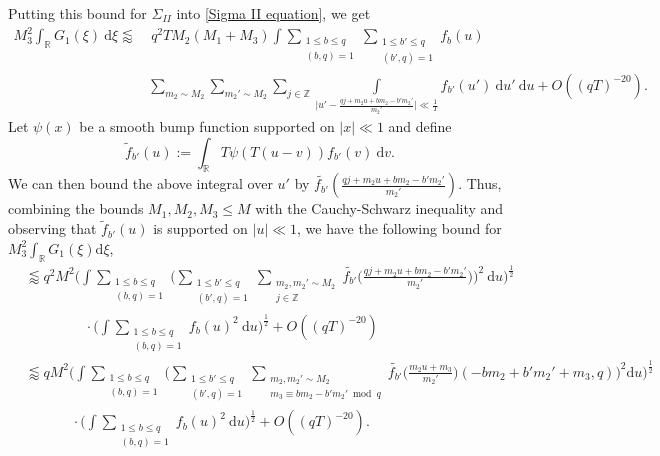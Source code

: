 \documentclass[12pt]{amsart}
\theoremstyle{definition}
\theoremstyle{plain}
\theoremstyle{remark}
\numberwithin{equation}{section}
\numberwithin{theorem}{section}
\numberwithin{equation}{section}
\begin{document}
	Putting this bound for $\Sigma_{II}$ into \eqref{Sigma II equation}, we get
	\begin{align*}
		M_{3}^{2}\int_{\mathbb{R}}G_{1}(\xi)\: \mathrm{d} \xi \lessapprox& \
		q^{2}TM_{2}(M_{1}+M_{3})
		\int
		\sum_{\substack{1 \leq b \leq q \\ (b, q)=1}}
		\sum_{\substack{1 \leq b' \leq q \\ (b', q)=1}}
		f_{b}(u)
		\\
		&\sum_{m_{2}\sim M_{2}}\sum_{m_{2}'\sim M_{2}}
		\sum_{j \in \mathbb{Z}}
		\int\limits_{\big|u'-\frac{qj+m_{2}u+bm_{2}-b'm_{2}'}{m_{2}'}\big|\ll \frac{1}{T}} f_{b'}(u')
		\:\mathrm{d} u'\:\mathrm{d} u+O((qT)^{-20}).
	\end{align*}
	Let $\psi(x)$ be a smooth bump function supported on $|x| \ll 1$ and define
	\[\tilde{f}_{b'}(u):=\int_{\mathbb{R}}T\psi(T(u-v))f_{b'}(v)\:\mathrm{d}v.\] 
	We can then bound the above integral over $u'$ by $\tilde{f_{b'}}(\frac{qj+m_{2}u+bm_{2}-b'm_{2}'}{m_{2}'})$. Thus, combining the bounds $M_{1}, M_{2}, M_{3} \leq M$ with the Cauchy-Schwarz inequality and observing that $\tilde{f}_{b'}(u)$ is supported on $|u|\ll 1$, we have the following bound for $M_3^2 \int_{\mathbb{R}} G_1(\xi) \mathrm{d} \xi$,
	\begin{align*}
		&\lessapprox q^{2}M^{2}
		\bigg(\int\sum_{\substack{1 \leq b \leq q \\ (b, q)=1}}
		\bigg(\sum_{\substack{1 \leq b' \leq q \\ (b', q)=1}}
		\sum_{\substack{m_{2},m_2'\sim M_{2} \\ j \in \mathbb{Z}}} \tilde{f_{b'}}\bigg(\frac{qj+m_{2}u+bm_{2}-b'm_{2}'}{m_{2}'}\bigg)\bigg)^{2} \: \mathrm{d}u\bigg)^{\frac{1}{2}} \\
		& \phantom{abcdefghi} \cdot \bigg(\int\sum_{\substack{1 \leq b \leq q \\ (b, q)=1}}
		f_{b}(u)^{2}\: \mathrm{d}u\bigg)^{\frac{1}{2}}+O((qT)^{-20})
		\\
		& \lessapprox qM^2 \bigg(\int\sum_{\substack{1 \leq b \leq q \\ (b, q)=1}}
		\bigg(\sum_{\substack{1 \leq b' \leq q \\ (b', q)=1}}
		\sum_{\substack{m_{2}, m_{2}'\sim M_{2} \\ m_{3} \equiv bm_{2}-b'm_{2}' \bmod q}}
		\tilde{f_{b'}}\bigg(\frac{m_{2}u+m_{3}}{m_{2}'}\bigg)(-bm_{2}+b'm_{2}'+m_{3}, q)\bigg)^{2} \mathrm{d}u\bigg)^{\frac{1}{2}} \\
		& \phantom{abcdefg} \cdot \bigg(\int\sum_{\substack{1 \leq b \leq q \\ (b, q)=1}}
		f_{b}(u)^{2}\: \mathrm{d}u\bigg)^{\frac{1}{2}} +  O((qT)^{-20}).
	\end{align*}
\end{document}
